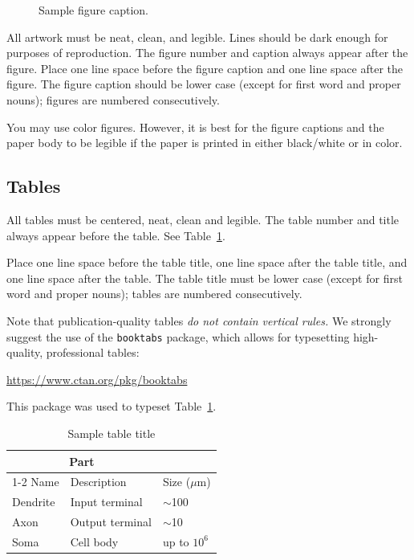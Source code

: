 \documentclass{article}
\begin{document}
\begin{figure}
  \centering
  \fbox{\rule[-.5cm]{0cm}{4cm} \rule[-.5cm]{4cm}{0cm}}
  \caption{Sample figure caption.}
\end{figure}


All artwork must be neat, clean, and legible. Lines should be dark enough for
purposes of reproduction. The figure number and caption always appear after the
figure. Place one line space before the figure caption and one line space after
the figure. The figure caption should be lower case (except for first word and
proper nouns); figures are numbered consecutively.


You may use color figures.  However, it is best for the figure captions and the
paper body to be legible if the paper is printed in either black/white or in
color.


\subsection{Tables}


All tables must be centered, neat, clean and legible.  The table number and
title always appear before the table.  See Table~\ref{sample-table}.


Place one line space before the table title, one line space after the
table title, and one line space after the table. The table title must
be lower case (except for first word and proper nouns); tables are
numbered consecutively.


Note that publication-quality tables \emph{do not contain vertical rules.} We
strongly suggest the use of the \verb+booktabs+ package, which allows for
typesetting high-quality, professional tables:
\begin{center}
  \url{https://www.ctan.org/pkg/booktabs}
\end{center}
This package was used to typeset Table~\ref{sample-table}.


\begin{table}
  \caption{Sample table title}
  \label{sample-table}
  \centering
  \begin{tabular}{lll}
    \toprule
    \multicolumn{2}{c}{Part}                   \\
    \cmidrule(r){1-2}
    Name     & Description     & Size ($\mu$m) \\
    \midrule
    Dendrite & Input terminal  & $\sim$100     \\
    Axon     & Output terminal & $\sim$10      \\
    Soma     & Cell body       & up to $10^6$  \\
    \bottomrule
  \end{tabular}
\end{table}
\end{document}
